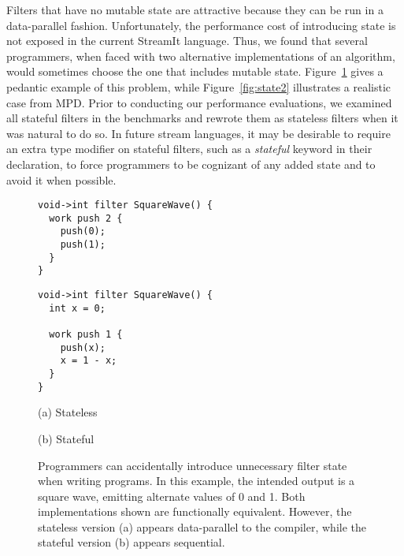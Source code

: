   Filters that have no mutable state are
  attractive because they can be run in a data-parallel fashion.
  Unfortunately, the performance cost of introducing state is not
  exposed in the current StreamIt language.  Thus, we found that
  several programmers, when faced with two alternative implementations
  of an algorithm, would sometimes choose the one that includes
  mutable state.  Figure~\ref{fig:state} gives a pedantic example of
  this problem, while Figure~\ref{fig:state2} illustrates a realistic
  case from MPD.  Prior to conducting our performance evaluations, we
  examined all stateful filters in the benchmarks and rewrote them as
  stateless filters when it was natural to do so.  In future stream
  languages, it may be desirable to require an extra type modifier on
  stateful filters, such as a {\it stateful} keyword in their
  declaration, to force programmers to be cognizant of any added state
  and to avoid it when possible.

\begin{figure}[t]
\hspace{0.1\textwidth}
\begin{minipage}{0.35\textwidth}
\centering
\ninepoint
\begin{verbatim}
void->int filter SquareWave() {
  work push 2 {
    push(0);
    push(1);
  }
}
\end{verbatim}
\end{minipage}
\hspace{0.1\textwidth}
\begin{minipage}{0.35\textwidth}
\centering
\ninepoint
\begin{verbatim}
void->int filter SquareWave() {
  int x = 0;
 
  work push 1 {
    push(x);
    x = 1 - x;
  }
}
\end{verbatim}
\end{minipage}

\begin{minipage}{0.5\textwidth}
\centering
(a) Stateless
\end{minipage}
\begin{minipage}{0.5\textwidth}
\centering
(b) Stateful
\end{minipage}
\caption[Accidental introduction of filter state (pedantic example).]{Programmers 
  can accidentally introduce unnecessary filter state when writing
  programs.  In this example, the intended output is a square wave,
  emitting alternate values of 0 and 1.  Both implementations shown
  are functionally equivalent.  However, the stateless version (a)
  appears data-parallel to the compiler, while the stateful version
  (b) appears sequential.\protect\label{fig:state}}
\end{figure}

